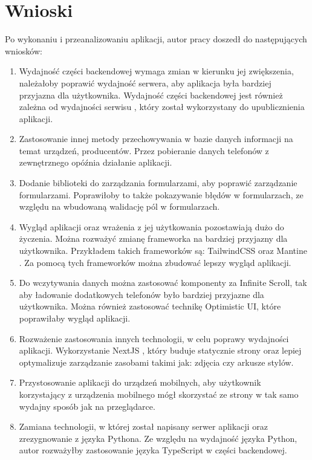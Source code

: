 \section{Wnioski}
Po wykonaniu i przeanalizowaniu aplikacji, autor pracy doszedł do następujących wniosków:
\begin{enumerate}
  \item Wydajność części backendowej wymaga zmian w kierunku jej zwiększenia, należałoby poprawić wydajność serwera, aby aplikacja była bardziej przyjazna dla użytkownika. Wydajność części backendowej jest również zależna od wydajności serwisu \cite{render}, który został wykorzystany do upublicznienia aplikacji.
  \item Zastosowanie innej metody przechowywania w bazie danych informacji na temat urządzeń, producentów. Przez pobieranie danych telefonów z zewnętrznego opóźnia działanie aplikacji.
  \item Dodanie biblioteki do zarządzania formularzami, aby poprawić zarządzanie formularzami. Poprawiłoby to także pokazywanie błędów w formularzach, ze względu na wbudowaną walidację pól w formularzach.
  \item Wygląd aplikacji oraz wrażenia z jej użytkowania pozostawiają dużo do życzenia. Można rozważyć zmianę frameworka na bardziej przyjazny dla użytkownika. Przykładem takich frameworków są: TailwindCSS \cite{tailwindcss} oraz Mantine \cite{mantine}. Za pomocą tych frameworków można zbudować lepszy wygląd aplikacji.
  \item Do wczytywania danych można zastosować komponenty za Infinite Scroll, tak aby ładowanie dodatkowych telefonów było bardziej przyjazne dla użytkownika. Można również zastosować technikę Optimistic UI, które poprawiłaby wygląd aplikacji.
  \item Rozważenie zastosowania innych technologii, w celu poprawy wydajności aplikacji. Wykorzystanie NextJS \cite{nextjs}, który buduje statycznie strony oraz lepiej optymalizuje zarządzanie zasobami takimi jak: zdjęcia czy arkusze stylów.
  \item Przystosowanie aplikacji do urządzeń mobilnych, aby użytkownik korzystający z urządzenia mobilnego mógł skorzystać ze strony w tak samo wydajny sposób jak na przeglądarce.
  \item Zamiana technologii, w której został napisany serwer aplikacji oraz zrezygnowanie z języka Pythona. Ze względu na wydajność języka Python, autor rozważyłby zastosowanie języka TypeScript w części backendowej.
\end{enumerate}

